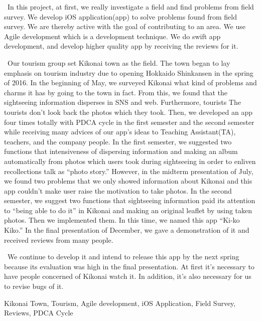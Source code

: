 \begin{eabstract} 

\ In this project, at first, we really investigate a field and find problems from field survey. We develop iOS application(app) to solve problems found from field survey. We are thereby active with the goal of contributing to an area. We use Agile development which is a development technique. We do swift app development, and develop higher quality app by receiving the reviews for it. 

\ Our tourism group set Kikonai town as the field. The town began to lay emphasis on tourism industry due to opening Hokkaido Shinkansen in the spring of 2016. In the beginning of May, we surveyed Kikonai what kind of problems and charms it has by going to the town in fact. From this, we found that the sightseeing information disperses in SNS and web. Furthermore, tourists The tourists don't look back the photos which they took. Then, we developed an app four times totally with PDCA cycle in the first semester and the second semester while receiving many advices of our app's ideas to Teaching Assistant(TA), teachers, and the company people. In the first semester, we suggested two functions that intensiveness of dispersing information and making an album automatically from photos which users took during sightseeing in order to enliven recollections talk as ``photo story.'' However, in the midterm presentation of July, we found two problems that we only showed information about Kikonai and this app couldn't make user raise the motivation to take photos. In the second semester, we suggest two functions that sightseeing information paid its attention to ``being able to do it'' in Kikonai and making an original leaflet by using taken photos. Then we implemented them. In this time, we named this app ``Ki-ko Kiko.'' In the final presentation of December, we gave a demonstration of it and received reviews from many people.

\ We continue to develop it and intend to release this app by the next spring because its evaluation was high in the final presentation. At first it's necessary to have people concerned of Kikonai watch it. In addition, it's also necessary for us to revise bugs of it.



\begin{ekeyword}
Kikonai Town, Tourism, Agile development, iOS Application, Field Survey, Reviews, PDCA Cycle
\end{ekeyword}
\end{eabstract}